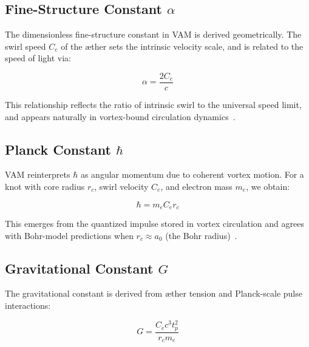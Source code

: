 \documentclass[12pt]{article}
\begin{document}
            \subsection{Fine-Structure Constant \boldmath\( \alpha \)}
            The dimensionless fine-structure constant in VAM is derived geometrically. The swirl speed \( C_e \) of the æther sets the intrinsic velocity scale, and is related to the speed of light via:
        
            \begin{equation}
            \alpha = \frac{2C_e}{c}
            \label{eq:fine_structure_vam}
            \end{equation}
        
            This relationship reflects the ratio of intrinsic swirl to the universal speed limit, and appears naturally in vortex-bound circulation dynamics~\cite{volovik2003universe, ranada1990topological}.
        
            \subsection{Planck Constant \boldmath\( \hbar \)}
            VAM reinterprets \( \hbar \) as angular momentum due to coherent vortex motion. For a knot with core radius \( r_c \), swirl velocity \( C_e \), and electron mass \( m_e \), we obtain:
        
            \begin{equation}
            \hbar = m_e C_e r_c
            \label{eq:planck_vam}
            \end{equation}
        
            This emerges from the quantized impulse stored in vortex circulation and agrees with Bohr-model predictions when \( r_c \approx a_0 \) (the Bohr radius)~\cite{moffatt1969knottedness}.
        
            \subsection{Gravitational Constant \boldmath\( G \)}
            The gravitational constant is derived from æther tension and Planck-scale pulse interactions:
        
            \begin{equation}
                G = \frac{C_e c^3 t_p^2}{r_c m_e}
            \label{eq:gravity_vam}
            \end{equation}
        
\end{document}
